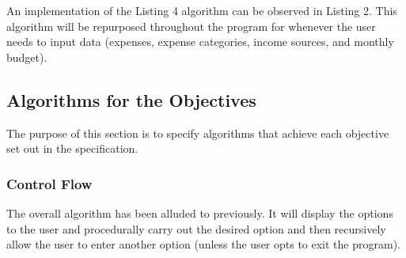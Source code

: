 \documentclass[11pt]{article}
\begin{document}
  An implementation of the Listing 4 algorithm can be observed in Listing 2.
  This algorithm will be repurposed throughout the program for whenever the user needs to input data (expenses, expense categories, income sources, and monthly budget).

  \subsection{Algorithms for the Objectives}
  The purpose of this section is to specify algorithms that achieve each objective set out in the specification.
  \subsubsection{Control Flow}
  The overall algorithm has been alluded to previously. It will display the options to the user and procedurally carry out the desired option and then recursively allow the user to enter another option (unless the user opts to exit the program).
\end{document}
